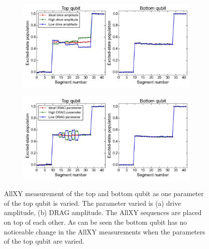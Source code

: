         \begin{figure}
        \centering
           \begin{subfigure}[b]{\textwidth}
           \includegraphics[width=1\linewidth]{../Figures/Exploring frequency re-use/AllXY_drive_top.png}
           \caption{}
           \label{fig:AllXY drive top}
        \end{subfigure}

        \begin{subfigure}[b]{\textwidth}
           \includegraphics[width=1\linewidth]{../Figures/Exploring frequency re-use/AllXY_drag_top.png}
           \caption{}
           \label{fig:AllXY DRAG top}
        \end{subfigure}

        \caption[Two numerical solutions]{AllXY measurement of the top and bottom qubit as one parameter of the top qubit is varied. The parameter varied is (a) drive amplitude, (b) DRAG amplitude. The AllXY sequences are placed on top of each other. As can be seen the bottom qubit has no noticeable change in the AllXY measurements when the parameters of the top qubit are varied.}
        \label{fig:AllXY individual control}
        \end{figure}

